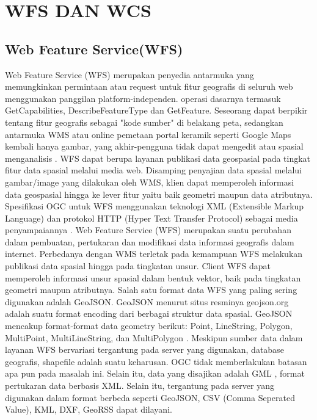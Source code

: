 \section{WFS DAN WCS}

\subsection{Web Feature Service(WFS)}
Web Feature Service (WFS) merupakan penyedia antarmuka yang memungkinkan permintaan atau request untuk fitur geografis di seluruh web menggunakan panggilan platform-independen. operasi dasarnya termasuk GetCapabilities, DescribeFeatureType dan GetFeature. Seseorang dapat berpikir tentang fitur geografis sebagai "kode sumber" di belakang peta, sedangkan antarmuka WMS atau online pemetaan portal keramik seperti Google Maps kembali hanya gambar, yang akhir-pengguna tidak dapat mengedit atau spasial menganalisis \cite{franto2015integrasi}.
WFS dapat berupa layanan publikasi data geospasial pada tingkat fitur data spasial melalui media web. Disamping penyajian data spasial melalui gambar/image yang dilakukan oleh WMS, klien dapat memperoleh informasi data geospasial hingga ke lever fitur yaitu baik geometri maupun data atributnya. Spesifikasi OGC untuk WFS menggunakan teknologi XML (Extensible Markup Language) dan protokol HTTP (Hyper Text Transfer Protocol) sebagai media penyampaiannya \cite{ayuningtias2014aplikasi}.
Web Feature Service (WFS) merupakan suatu perubahan dalam pembuatan, pertukaran dan modifikasi data informasi geografis dalam internet. Perbedanya dengan WMS terletak pada kemampuan WFS melakukan publikasi data spasial hingga pada tingkatan unsur. Client WFS dapat memperoleh informasi unsur spasial dalam bentuk vektor, baik pada tingkatan geometri maupun atributnya. Salah satu format data WFS yang paling sering digunakan adalah GeoJSON. GeoJSON menurut situs resminya geojson.org adalah suatu format encoding dari berbagai struktur data spasial. GeoJSON mencakup format-format data geometry berikut: Point, LineString, Polygon, MultiPoint, MultiLineString, dan MultiPolygon \cite{wibowoseminar}.
Meskipun sumber data dalam layanan WFS bervariasi tergantung pada server yang digunakan, database geografis, shapefile adalah suatu keharusan. OGC tidak memberlakukan batasan apa pun pada masalah ini. Selain itu, data yang disajikan adalah GML \cite{putri2018pembuatan}, format pertukaran data berbasis XML. Selain itu, tergantung pada server yang digunakan dalam format berbeda seperti GeoJSON, CSV (Comma Seperated Value), KML, DXF, GeoRSS dapat dilayani.

